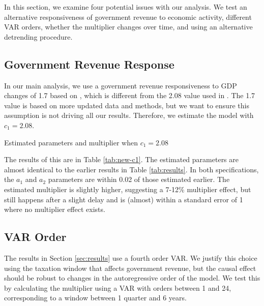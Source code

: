 In this section, we examine four potential issues with our analysis. We test an alternative responsiveness of government revenue to economic activity, different VAR orders, whether the multiplier changes over time, and using an alternative detrending procedure. 


\subsection{Government Revenue Response}

In our main analysis, we use a government revenue responsiveness to GDP changes of 1.7 based on \textcite{lutz2010fiscal}, which is different from the 2.08 value used in \textcite{blanchard2002empirical}. The 1.7 value is based on more updated data and methods, but we want to ensure this assumption is not driving all our results. Therefore, we estimate the model with $c_1 = 2.08$.

\begin{table}[t]
    \centering
    \caption{Estimated parameters and multiplier when $c_1 = 2.08$}
    
    \label{tab:new-c1}
\end{table}

The results of this are in Table \ref{tab:new-c1}. The estimated parameters are almost identical to the earlier results in Table \ref{tab:results}. In both specifications, the $a_1$ and $a_2$ parameters are within 0.02 of those estimated earlier. The estimated multiplier is slightly higher, suggesting a 7-12\% multiplier effect, but still happens after a slight delay and is (almost) within a standard error of 1 where no multiplier effect exists.


\subsection{VAR Order}

The results in Section \ref{sec:results} use a fourth order VAR. We justify this choice using the taxation window that affects government revenue, but the causal effect should be robust to changes in the autoregressive order of the model. We test this by calculating the multiplier using a VAR with orders between 1 and 24, corresponding to a window between 1 quarter and 6 years.

